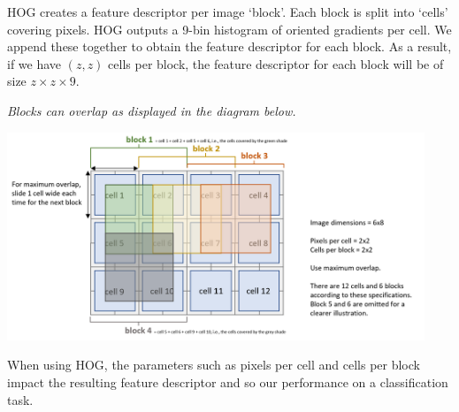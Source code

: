 HOG creates a feature descriptor per image `block'. Each block is split into `cells' covering pixels. HOG outputs a 9-bin histogram of oriented gradients per cell. We append these together to obtain the feature descriptor for each block. As a result, if we have $(z,z)$ cells per block, the feature descriptor for each block will be of size $z \times z \times 9$. 

\emph{Blocks can overlap as displayed in the diagram below.}
%
\begin{center}
    \includegraphics[clip, trim = {0.2cm, 0.35cm, 0.2cm, 0.2cm}, width=12.5cm]{hog-diagram.png} %
\end{center}
%
When using HOG, the parameters such as pixels per cell and cells per block impact the resulting feature descriptor and so our performance on a classification task.

